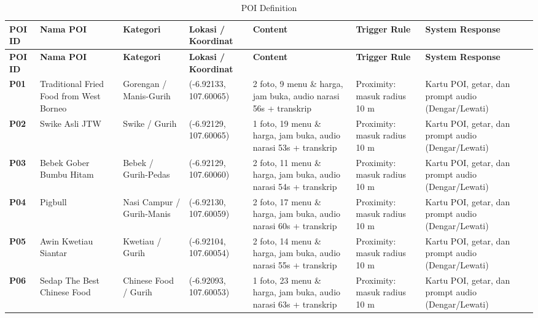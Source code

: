 \begin{landscapepage}
\begin{longtable}{|L{0.06}|L{0.17}|L{0.14}|L{0.14}|L{0.21}|L{0.11}|L{0.17}|}
\caption{POI Definition}\\
\hline
{}\textbf{POI ID} & \textbf{Nama POI} & \textbf{Kategori} & \textbf{Lokasi / Koordinat} & \textbf{Content} & \textbf{Trigger Rule} & \textbf{System Response} \\ \hline
\endfirsthead
\hline
{}\textbf{POI ID} & \textbf{Nama POI} & \textbf{Kategori} & \textbf{Lokasi / Koordinat} & \textbf{Content} & \textbf{Trigger Rule} & \textbf{System Response} \\ \hline
\endhead
\textbf{P01} & Traditional Fried Food from West Borneo & Gorengan / Manis-Gurih & (-6.92133, 107.60065) & 2 foto, 9 menu \& harga, jam buka, audio narasi 56s + transkrip & Proximity: masuk radius 10 m & Kartu POI, getar, dan prompt audio (Dengar/Lewati) \\ \hline
\textbf{P02} & Swike Asli JTW & Swike / Gurih & (-6.92129, 107.60065) & 1 foto, 19 menu \& harga, jam buka, audio narasi 53s + transkrip & Proximity: masuk radius 10 m & Kartu POI, getar, dan prompt audio (Dengar/Lewati) \\ \hline
\textbf{P03} & Bebek Gober Bumbu Hitam & Bebek / Gurih-Pedas & (-6.92129, 107.60060) & 2 foto, 11 menu \& harga, jam buka, audio narasi 54s + transkrip & Proximity: masuk radius 10 m & Kartu POI, getar, dan prompt audio (Dengar/Lewati) \\ \hline
\textbf{P04} & Pigbull & Nasi Campur / Gurih-Manis & (-6.92130, 107.60059) & 2 foto, 17 menu \& harga, jam buka, audio narasi 60s + transkrip & Proximity: masuk radius 10 m & Kartu POI, getar, dan prompt audio (Dengar/Lewati) \\ \hline
\textbf{P05} & Awin Kwetiau Siantar & Kwetiau / Gurih & (-6.92104, 107.60054) & 2 foto, 14 menu \& harga, jam buka, audio narasi 55s + transkrip & Proximity: masuk radius 10 m & Kartu POI, getar, dan prompt audio (Dengar/Lewati) \\ \hline
\textbf{P06} & Sedap The Best Chinese Food & Chinese Food / Gurih & (-6.92093, 107.60053) & 1 foto, 23 menu \& harga, jam buka, audio narasi 63s + transkrip & Proximity: masuk radius 10 m & Kartu POI, getar, dan prompt audio (Dengar/Lewati) \\ \hline

\end{longtable}
\end{landscapepage}
